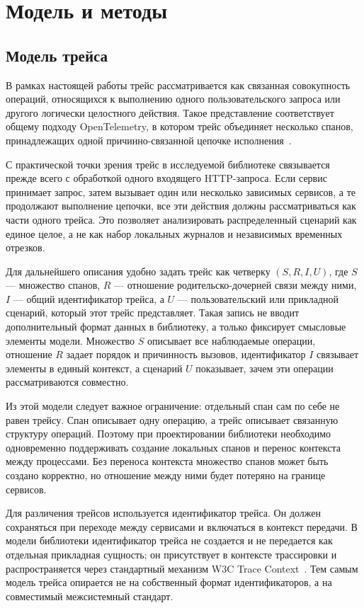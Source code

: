 \chapter{Модель и методы}
\label{chap:model-and-methods}

\section{Модель трейса}

В рамках настоящей работы трейс рассматривается как связанная совокупность
операций, относящихся к выполнению одного пользовательского запроса или другого
логически целостного действия. Такое представление соответствует общему подходу
OpenTelemetry, в котором трейс объединяет несколько спанов, принадлежащих одной
причинно-связанной цепочке исполнения~\cite{otelOverview,otelTraceApi}.

С практической точки зрения трейс в исследуемой библиотеке связывается прежде
всего с обработкой одного входящего HTTP-запроса. Если сервис принимает запрос,
затем вызывает один или несколько зависимых сервисов, а те продолжают выполнение
цепочки, все эти действия должны рассматриваться как части одного трейса. Это
позволяет анализировать распределенный сценарий как единое целое, а не как набор
локальных журналов и независимых временных отрезков.

Для дальнейшего описания удобно задать трейс как четверку
\((S, R, I, U)\), где \(S\) --- множество спанов, \(R\) --- отношение
родительско-дочерней связи между ними, \(I\) --- общий идентификатор трейса, а
\(U\) --- пользовательский или прикладной сценарий, который этот трейс
представляет. Такая запись не вводит дополнительный формат данных в библиотеку,
а только фиксирует смысловые элементы модели. Множество \(S\) описывает все
наблюдаемые операции, отношение \(R\) задает порядок и причинность вызовов,
идентификатор \(I\) связывает элементы в единый контекст, а сценарий \(U\)
показывает, зачем эти операции рассматриваются совместно.

Из этой модели следует важное ограничение: отдельный спан сам по себе не равен
трейсу. Спан описывает одну операцию, а трейс описывает связанную структуру
операций. Поэтому при проектировании библиотеки необходимо одновременно
поддерживать создание локальных спанов и перенос контекста между процессами. Без
переноса контекста множество спанов может быть создано корректно, но отношение
между ними будет потеряно на границе сервисов.

Для различения трейсов используется идентификатор трейса. Он должен сохраняться при
переходе между сервисами и включаться в контекст передачи. В модели библиотеки
идентификатор трейса не создается и не передается как отдельная прикладная
сущность; он присутствует в контексте трассировки и распространяется через
стандартный механизм W3C Trace Context~\cite{w3cTraceContext}. Тем самым модель
трейса опирается не на собственный формат идентификаторов, а на совместимый
межсистемный стандарт.

